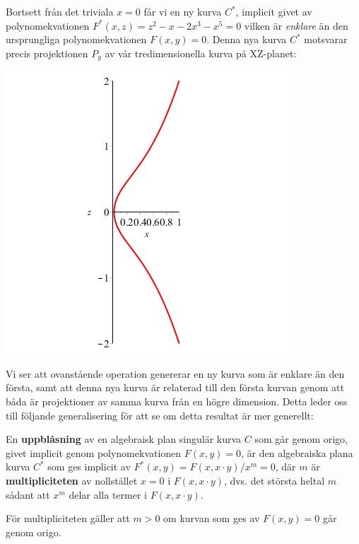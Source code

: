 Bortsett från det triviala $x=0$ får vi en ny kurva $C^*$, implicit givet av polynomekvationen $F^*(x,z)=z^2-x-2x^3-x^5=0$ vilken är \emph{enklare} än den ursprungliga polynomekvationen $F(x,y)=0$. Denna nya kurva $C^*$ motsvarar precis projektionen $P_y$ av vår tredimensionella kurva på XZ-planet:

\begin{center}
\includegraphics[scale=0.5]{Export/blowupex1_4.png}
\end{center}

Vi ser att ovanstående operation genererar en ny kurva som är enklare än den första, samt att denna nya kurva är relaterad till den första kurvan genom att båda är projektioner av samma kurva från en högre dimension. Detta leder oss till följande generalisering för att se om detta resultat är mer generellt:

\begin{Definition}
\label{BlowUp}
En \textbf{uppblåsning} av en algebraisk plan singulär kurva $C$ som går genom origo, givet implicit genom polynomekvationen $F(x,y)=0$, är den algebraiska plana kurva $C^*$ som ges implicit av $F^*(x,y) = F(x,x\cdot y)/x^m=0$, där $m$ är \textbf{multipliciteten} av nollstället $x=0$ i $F(x,x\cdot y)$, dvs. det största heltal $m$ sådant att $x^m$ delar alla termer i $F(x,x\cdot y)$.
\end{Definition}

\begin{Theorem}
\label{MultiplicityPositive}
För multipliciteten gäller att $m > 0$ om kurvan som ges av $F(x,y)=0$ går genom origo.
\end{Theorem}

